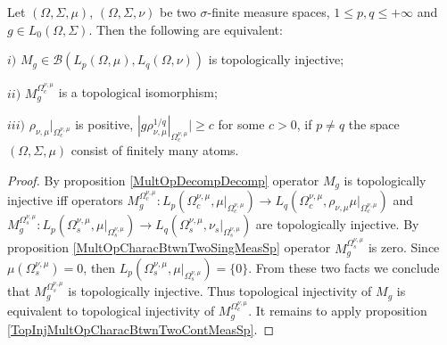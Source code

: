 \begin{proposition}\label{TopInjMultOpCharacBtwnTwoMeasSp} Let $(\Omega,\Sigma,\mu)$, $(\Omega,\Sigma,\nu)$ be two $\sigma$-finite measure spaces, $1\leq p,q\leq +\infty$ and $g\in L_0(\Omega,\Sigma)$. Then the following are equivalent:

$i)$ $M_g\in\mathcal{B}(L_p(\Omega,\mu), L_q(\Omega,\nu))$ is topologically injective;

$ii)$ $M_g^{\Omega_c^{\nu,\mu}}$ is a topological isomorphism;

$iii)$ $\rho_{\nu,\mu}|_{\Omega_c^{\nu,\mu}}$ is positive, $|g \rho_{\nu,\mu}^{1/q}|_{\Omega_c^{\nu,\mu}}|\geq c$ for some $c>0$, if $p\neq q$ the space $(\Omega,\Sigma,\mu)$ consist of finitely many atoms.
\end{proposition}
\begin{proof}
By proposition \ref{MultOpDecompDecomp} operator $M_g$ is topologically injective iff operators $M_g^{\Omega_c^{\nu,\mu}}:L_p(\Omega_c^{\nu,\mu},\mu|_{\Omega_c^{\nu,\mu}})\to L_q(\Omega_c^{\nu,\mu},\rho_{\nu,\mu} \mu|_{\Omega_c^{\nu,\mu}})$ and $M_g^{\Omega_s^{\nu,\mu}}:L_p(\Omega_s^{\nu,\mu},\mu|_{\Omega_s^{\nu,\mu}})\to L_q(\Omega_s^{\nu,\mu},\nu_s|_{\Omega_s^{\nu,\mu}})$ are topologically injective. By proposition \ref{MultOpCharacBtwnTwoSingMeasSp} operator $M_g^{\Omega_s^{\nu,\mu}}$ is zero. Since $\mu(\Omega_s^{\nu,\mu})=0$, then $L_p(\Omega_s^{\nu,\mu},\mu|_{\Omega_s^{\nu,\mu}})=\{0\}$. From these two facts we conclude that $M_g^{\Omega_s^{\nu,\mu}}$ is topologically injective. Thus topological injectivity of $M_g$ is equivalent to topological injectivity of  $M_g^{\Omega_c^{\nu,\mu}}$. It remains to apply proposition \ref{TopInjMultOpCharacBtwnTwoContMeasSp}.
\end{proof}

